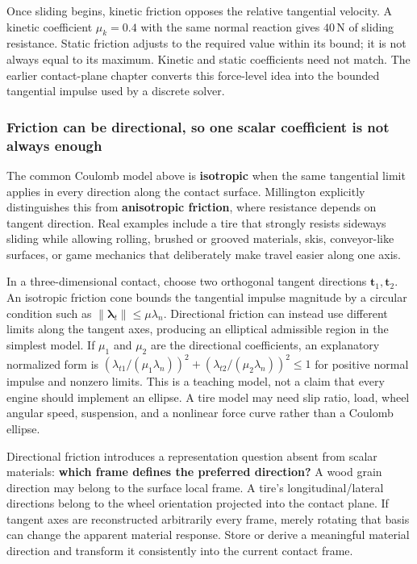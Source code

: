 Once sliding begins, kinetic friction opposes the relative tangential velocity. A kinetic coefficient \(\mu_k=0.4\) with the same normal reaction gives \(40\,\mathrm N\) of sliding resistance. Static friction adjusts to the required value within its bound; it is not always equal to its maximum. Kinetic and static coefficients need not match. The earlier contact-plane chapter converts this force-level idea into the bounded tangential impulse used by a discrete solver.

\subsubsection{Friction can be directional, so one scalar coefficient is not always enough}\label{06-engine-ii-ch047-friction-can-be-directional-so-one-scalar-coefficient-is-not-always-enough}

The common Coulomb model above is \textbf{isotropic} when the same tangential limit applies in every direction along the contact surface. Millington explicitly distinguishes this from \textbf{anisotropic friction}, where resistance depends on tangent direction. Real examples include a tire that strongly resists sideways sliding while allowing rolling, brushed or grooved materials, skis, conveyor-like surfaces, or game mechanics that deliberately make travel easier along one axis.

In a three-dimensional contact, choose two orthogonal tangent directions \(\mathbf{t}_1,\mathbf{t}_2\). An isotropic friction cone bounds the tangential impulse magnitude by a circular condition such as \(\|\boldsymbol{\lambda}_t\|\le\mu\lambda_n\). Directional friction can instead use different limits along the tangent axes, producing an elliptical admissible region in the simplest model. If \(\mu_1\) and \(\mu_2\) are the directional coefficients, an explanatory normalized form is \((\lambda_{t1}/(\mu_1\lambda_n))^2+(\lambda_{t2}/(\mu_2\lambda_n))^2\le1\) for positive normal impulse and nonzero limits. This is a teaching model, not a claim that every engine should implement an ellipse. A tire model may need slip ratio, load, wheel angular speed, suspension, and a nonlinear force curve rather than a Coulomb ellipse.

Directional friction introduces a representation question absent from scalar materials: \textbf{which frame defines the preferred direction?} A wood grain direction may belong to the surface local frame. A tire's longitudinal/lateral directions belong to the wheel orientation projected into the contact plane. If tangent axes are reconstructed arbitrarily every frame, merely rotating that basis can change the apparent material response. Store or derive a meaningful material direction and transform it consistently into the current contact frame.

